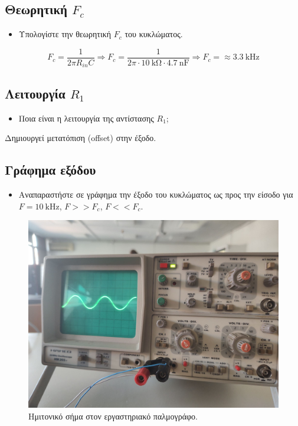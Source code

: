 \documentclass[12pt]{article}
\begin{document}
\subsection{Θεωρητική $F_c$}

\begin{itemize}
	\item Υπολογίστε την θεωρητική $F_c$ του κυκλώματος.
\end{itemize}

\[F_c = \frac{1}{2 \pi R_{in} C} \Rightarrow
F_c = \frac{1}{2 \pi \cdot \SI{10}{\kohm} \cdot \SI{4.7}{\nano\farad}} \Rightarrow
F_c = \approx \SI{3.3}{\kilo\hertz}\]

\subsection{Λειτουργία $R_1$}

\begin{itemize}
	\item Ποια είναι η λειτουργία της αντίστασης $R_1$;
\end{itemize}

Δημιουργεί μετατόπιση (offset) στην έξοδο.

\subsection{Γράφημα εξόδου}

\begin{itemize}
	\item Αναπαραστήστε σε γράφημα την έξοδο του κυκλώματος ως προς την
		είσοδο για $F = \SI{10}{\kilo\hertz}$, $F >> F_c$, $F << F_c$.
\end{itemize}

\begin{figure}[H]
	\centering
	\includegraphics[width=\linewidth]{./res/sine_real.jpg}
	\caption{Ημιτονικό σήμα στον εργαστηριακό παλμογράφο.}
\end{figure}
\end{document}
